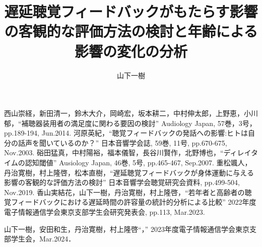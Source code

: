 \documentclass[twocolumn]{jsarticle}
\title{遅延聴覚フィードバックがもたらす影響の客観的な評価方法の検討と年齢による影響の変化の分析}
\author{山下\hspace{1zw}一樹}
\begin{document}
\maketitle


% 






\begin{thebibliography}{99}
	西山崇経，新田清一，鈴木大介，岡崎宏，坂本耕二，中村伸太郎，上野恵，小川郁，``補聴器装用者の満足度に関わる要因の検討'' Audiology Japan, 57巻，3号，pp.189-194, Jun.2014.
	河原英紀，``聴覚フィードバックの発話への影響:ヒトは自分の話声を聞いているのか？'' 日本音響学会誌, 59巻, 11号, pp.670-675, Nov.2003.
	硲田猛真，中村陽裕，福本儀智，長谷川賢作，北野博也，``ディレイタイムの認知閾値'' Ausiology Japan, 46巻, 5号, pp.465-467, Sep.2007.
	重松颯人，丹治寛樹，村上隆啓，松本直樹，``遅延聴覚フィードバックが身体運動に与える影響の客観的な評価方法の検討'' 日本音響学会聴覚研究会資料, pp.499-504, Nov.2019.
	香山実結花，山下一樹，丹治寛樹，村上隆啓，``若年者と高齢者の聴覚フィードバックにおける遅延時間の許容量の統計的分析による比較'' 2022年度電子情報通信学会東京支部学生会研究発表会, pp.113, Mar.2023.
\end{thebibliography}

\begin{thepublished}{99}
	山下一樹，安田和生，丹治寛樹，村上隆啓``，\<'' 2023年度電子情報通信学会東京支部学生会，Mar.2024．
\end{thepublished}
\end{document}
